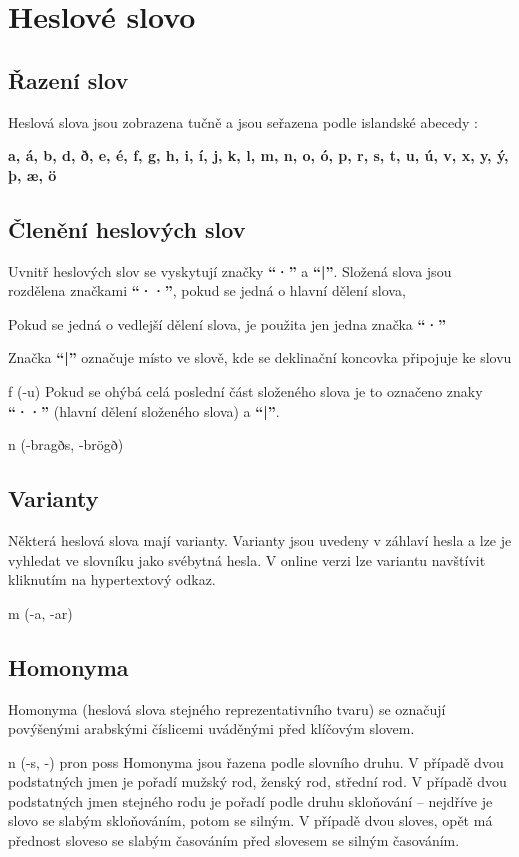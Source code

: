 \section{Heslové slovo}

\subsection{Řazení slov }
Heslová  slova jsou zobrazena tučně a jsou seřazena podle islandské abecedy :

\textbf{a, á, b, d, ð, e, é, f, g, h, i, í, j, k, l, m, n, o, ó, p, r, s, t, u, ú, v, x, y, ý, þ, æ, ö}

\subsection{Členění heslových slov}
Uvnitř heslových slov  se vyskytují značky  \textbf{“·”} a \textbf{“|”}. Složená slova jsou rozdělena značkami \textbf{“··”}, pokud se jedná o hlavní dělení slova,  


Pokud se jedná o vedlejší dělení slova, je použita jen jedna značka \textbf{“·”} 


Značka \textbf{“|”} označuje místo ve slově, kde se deklinační koncovka připojuje ke slovu


 {\small{f (-u) }}
Pokud se ohýbá celá poslední část složeného slova je to označeno znaky \textbf{“··”} (hlavní dělení složeného slova) a \textbf{“|”}.


 {\small{n (-bragðs, -brögð)}}

\subsection{Varianty}
Některá heslová slova mají varianty. Varianty jsou uvedeny v záhlaví hesla a lze je vyhledat ve slovníku jako svébytná hesla. V online verzi lze variantu navštívit kliknutím na hypertextový odkaz. 

	
 {\small{m (-a, -ar)}}

\subsection{Homonyma }
Homonyma (heslová slova stejného reprezentativního tvaru) se označují povýšenými arabskými číslicemi uváděnými před klíčovým slovem. 


 {\small{n (-s, -)}} 
 {\small{pron poss}}
Homonyma jsou řazena podle slovního druhu. V případě dvou  podstatných jmen je pořadí mužský rod, ženský rod, střední rod. V případě dvou podstatných jmen stejného rodu je pořadí podle druhu skloňování – nejdříve je slovo se slabým skloňováním, potom se silným. V případě dvou sloves, opět má přednost sloveso se slabým časováním před slovesem se silným časováním.


